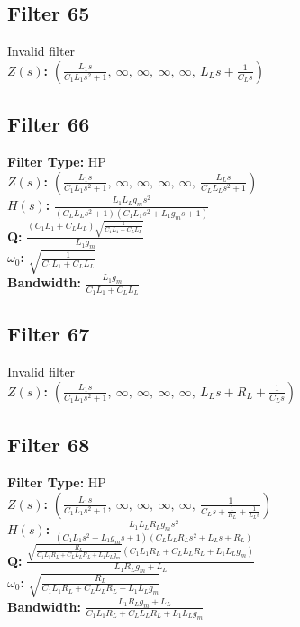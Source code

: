 \documentclass{article}
\begin{document}
\subsection*{Filter 65}
Invalid filter \\ 
\textbf{$Z(s)$:} $\left( \frac{L_{1} s}{C_{1} L_{1} s^{2} + 1}, \  \infty, \  \infty, \  \infty, \  \infty, \  L_{L} s + \frac{1}{C_{L} s}\right)$ \\ 
\subsection*{Filter 66}
\textbf{Filter Type:} HP \\ 
\textbf{$Z(s)$:} $\left( \frac{L_{1} s}{C_{1} L_{1} s^{2} + 1}, \  \infty, \  \infty, \  \infty, \  \infty, \  \frac{L_{L} s}{C_{L} L_{L} s^{2} + 1}\right)$ \\ 
\textbf{$H(s)$:} $\frac{L_{1} L_{L} g_{m} s^{2}}{\left(C_{L} L_{L} s^{2} + 1\right) \left(C_{1} L_{1} s^{2} + L_{1} g_{m} s + 1\right)}$ \\ 
\textbf{Q:} $\frac{\left(C_{1} L_{1} + C_{L} L_{L}\right) \sqrt{\frac{1}{C_{1} L_{1} + C_{L} L_{L}}}}{L_{1} g_{m}}$ \\ 
\textbf{$\omega_0$:} $\sqrt{\frac{1}{C_{1} L_{1} + C_{L} L_{L}}}$ \\ 
\textbf{Bandwidth:} $\frac{L_{1} g_{m}}{C_{1} L_{1} + C_{L} L_{L}}$ \\ 
\subsection*{Filter 67}
Invalid filter \\ 
\textbf{$Z(s)$:} $\left( \frac{L_{1} s}{C_{1} L_{1} s^{2} + 1}, \  \infty, \  \infty, \  \infty, \  \infty, \  L_{L} s + R_{L} + \frac{1}{C_{L} s}\right)$ \\ 
\subsection*{Filter 68}
\textbf{Filter Type:} HP \\ 
\textbf{$Z(s)$:} $\left( \frac{L_{1} s}{C_{1} L_{1} s^{2} + 1}, \  \infty, \  \infty, \  \infty, \  \infty, \  \frac{1}{C_{L} s + \frac{1}{R_{L}} + \frac{1}{L_{L} s}}\right)$ \\ 
\textbf{$H(s)$:} $\frac{L_{1} L_{L} R_{L} g_{m} s^{2}}{\left(C_{1} L_{1} s^{2} + L_{1} g_{m} s + 1\right) \left(C_{L} L_{L} R_{L} s^{2} + L_{L} s + R_{L}\right)}$ \\ 
\textbf{Q:} $\frac{\sqrt{\frac{R_{L}}{C_{1} L_{1} R_{L} + C_{L} L_{L} R_{L} + L_{1} L_{L} g_{m}}} \left(C_{1} L_{1} R_{L} + C_{L} L_{L} R_{L} + L_{1} L_{L} g_{m}\right)}{L_{1} R_{L} g_{m} + L_{L}}$ \\ 
\textbf{$\omega_0$:} $\sqrt{\frac{R_{L}}{C_{1} L_{1} R_{L} + C_{L} L_{L} R_{L} + L_{1} L_{L} g_{m}}}$ \\ 
\textbf{Bandwidth:} $\frac{L_{1} R_{L} g_{m} + L_{L}}{C_{1} L_{1} R_{L} + C_{L} L_{L} R_{L} + L_{1} L_{L} g_{m}}$ \\ 
\end{document}

